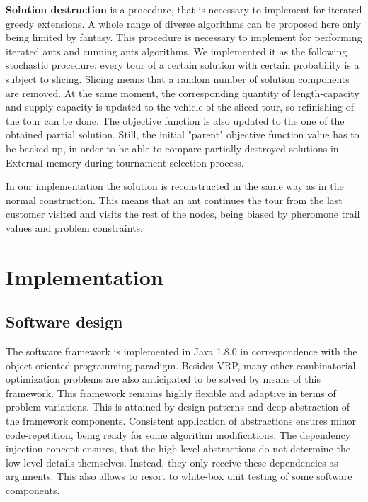 \documentclass[12pt,a4paper,oneside]{book}
\begin{document}
\textbf{Solution destruction} is a procedure, that is necessary to implement for iterated greedy extensions. A whole range of diverse algorithms can be proposed here only being limited by fantasy. This procedure is necessary to implement for performing iterated ants and cunning ants algorithms. We implemented it as the following stochastic procedure: every tour of a certain solution with certain probability is a subject to slicing. Slicing means that a random number of solution components are removed. At the same moment, the corresponding quantity of length-capacity and supply-capacity is updated to the vehicle of the sliced tour, so refinishing of the tour can be done. The objective function is also updated to the one of the obtained partial solution. Still, the initial "parent" objective function value has to be backed-up, in order to be able to compare partially destroyed solutions in External memory during tournament selection process.

In our implementation the solution is reconstructed in the same way as in the normal construction. This means that an ant continues the tour from the last customer visited and visits the rest of the nodes, being biased by pheromone trail values and problem constraints.



\chapter{Implementation}


\section{Software design}

The software framework is implemented in Java 1.8.0 in correspondence with the object-oriented programming paradigm. Besides VRP, many other combinatorial optimization problems are also anticipated to be solved by means of this framework. This framework remains highly flexible and adaptive in terms of problem variations. This is attained by design patterns and deep abstraction of the framework components. Consistent application of abstractions ensures minor code-repetition, being ready for some algorithm modifications. The dependency injection concept ensures, that the high-level abstractions do not determine the low-level details themselves. Instead, they only receive these dependencies as arguments. This also allows to resort to white-box unit testing of some software components.
\end{document}
